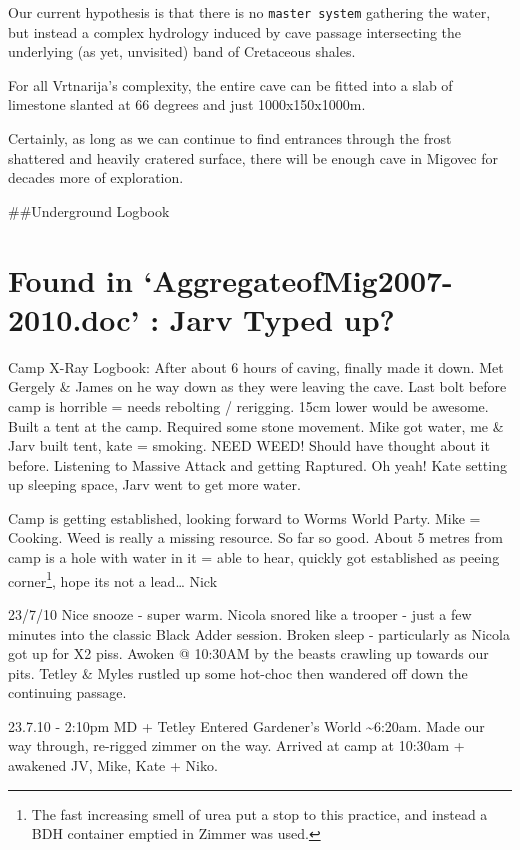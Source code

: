 Our current hypothesis is that there is no \texttt{master\ system}
gathering the water, but instead a complex hydrology induced by cave
passage intersecting the underlying (as yet, unvisited) band of
Cretaceous shales.

For all Vrtnarija's complexity, the entire cave can be fitted into a
slab of limestone slanted at 66 degrees and just 1000x150x1000m.

Certainly, as long as we can continue to find entrances through the
frost shattered and heavily cratered surface, there will be enough cave
in Migovec for decades more of exploration.

\#\#Underground Logbook

\hypertarget{found-in-aggregateofmig2007-2010.doc-jarv-typed-up}{%
\section{Found in `AggregateofMig2007-2010.doc' : Jarv Typed
up?}\label{found-in-aggregateofmig2007-2010.doc-jarv-typed-up}}

Camp X-Ray Logbook: After about 6 hours of caving, finally made it down.
Met Gergely \& James on he way down as they were leaving the cave. Last
bolt before camp is horrible = needs rebolting / rerigging. 15cm lower
would be awesome. Built a tent at the camp. Required some stone
movement. Mike got water, me \& Jarv built tent, kate = smoking. NEED
WEED! Should have thought about it before. Listening to Massive Attack
and getting Raptured. Oh yeah! Kate setting up sleeping space, Jarv went
to get more water.

Camp is getting established, looking forward to Worms World Party. Mike
= Cooking. Weed is really a missing resource. So far so good. About 5
metres from camp is a hole with water in it = able to hear, quickly got
established as peeing
corner\footnote{The fast increasing smell of urea put a stop to this practice, and instead a BDH container emptied in Zimmer was used.},
hope its not a lead\ldots{} Nick

23/7/10 Nice snooze - super warm. Nicola snored like a trooper - just a
few minutes into the classic Black Adder session. Broken sleep -
particularly as Nicola got up for X2 piss. Awoken @ 10:30AM by the
beasts crawling up towards our pits. Tetley \& Myles rustled up some
hot-choc then wandered off down the continuing passage.

23.7.10 - 2:10pm MD + Tetley Entered Gardener's World
\textasciitilde{}6:20am. Made our way through, re-rigged zimmer on the
way. Arrived at camp at 10:30am + awakened JV, Mike, Kate + Niko.

